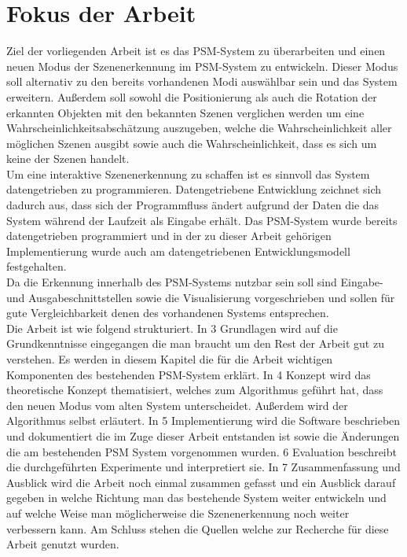 \section{Fokus der Arbeit}
Ziel der vorliegenden Arbeit ist es das PSM-System zu überarbeiten und einen neuen Modus der Szenenerkennung im PSM-System zu entwickeln. Dieser Modus soll alternativ zu den bereits vorhandenen Modi auswählbar sein und das System erweitern. Außerdem soll sowohl die Positionierung als auch die Rotation der erkannten Objekten mit den bekannten Szenen verglichen werden um eine Wahrscheinlichkeitsabschätzung auszugeben, welche die Wahrscheinlichkeit aller möglichen Szenen ausgibt sowie auch die Wahrscheinlichkeit, dass es sich um keine der Szenen  handelt.\smallskip\\
Um eine interaktive Szenenerkennung zu schaffen ist es sinnvoll das System datengetrieben zu programmieren. Datengetriebene Entwicklung zeichnet sich dadurch aus, dass sich der Programmfluss ändert aufgrund der Daten die das System während der Laufzeit als Eingabe erhält. Das PSM-System wurde bereits datengetrieben programmiert und in der zu dieser Arbeit gehörigen Implementierung wurde auch am datengetriebenen Entwicklungsmodell festgehalten.\smallskip\\ 
Da die Erkennung innerhalb des PSM-Systems nutzbar sein soll sind Eingabe- und Ausgabeschnittstellen sowie die Visualisierung vorgeschrieben und sollen für gute Vergleichbarkeit denen des vorhandenen Systems entsprechen.\smallskip\\
Die Arbeit ist wie folgend strukturiert. In 3 Grundlagen wird auf die Grundkenntnisse eingegangen die man braucht um den Rest der Arbeit gut zu verstehen. Es werden in diesem Kapitel die für die Arbeit wichtigen Komponenten des bestehenden PSM-System erklärt. In 4 Konzept wird das theoretische Konzept thematisiert, welches zum Algorithmus geführt hat, dass den neuen Modus vom alten System unterscheidet. Außerdem wird der Algorithmus selbst erläutert. In 5 Implementierung wird die Software beschrieben und dokumentiert die im Zuge dieser Arbeit entstanden ist sowie die Änderungen die am bestehenden PSM System vorgenommen wurden. 6 Evaluation beschreibt die durchgeführten Experimente und interpretiert sie. In 7 Zusammenfassung und Ausblick wird die Arbeit noch einmal zusammen gefasst und ein Ausblick darauf gegeben in welche Richtung man das bestehende System weiter entwickeln und auf welche Weise man  möglicherweise die Szenenerkennung noch weiter verbessern kann. Am Schluss stehen die Quellen welche zur Recherche für diese Arbeit genutzt wurden.

